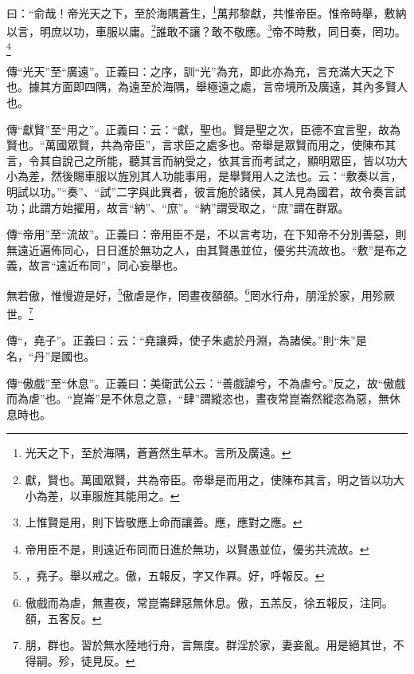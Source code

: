 曰：“俞哉！帝光天之下，至於海隅蒼生，\footnote{光天之下，至於海隅，蒼蒼然生草木。言所及廣遠。}萬邦黎獻，共惟帝臣。惟帝時舉，敷納以言，明庶以功，車服以庸。\footnote{獻，賢也。萬國眾賢，共為帝臣。帝舉是而用之，使陳布其言，明之皆以功大小為差，以車服旌其能用之。}誰敢不讓？敢不敬應。\footnote{上惟賢是用，則下皆敬應上命而讓善。應，應對之應。}帝不時敷，同日奏，罔功。\footnote{帝用臣不是，則遠近布同而日進於無功，以賢愚並位，優劣共流故。}


{\noindent\zhuan{}\fzbyks 傳“光天”至“廣遠”。正義曰：之序，訓“光”為充，即此亦為充，言充滿大天之下也。據其方面即四隅，為遠至於海隅，舉極遠之處，言帝境所及廣遠，其內多賢人也。 \par}

{\noindent\zhuan{}\fzbyks 傳“獻賢”至“用之”。正義曰：云：“獻，聖也。賢是聖之次，臣德不宜言聖，故為賢也。“萬國眾賢，共為帝臣”，言求臣之處多也。帝舉是眾賢而用之，使陳布其言，令其自說己之所能，聽其言而納受之，依其言而考試之，顯明眾臣，皆以功大小為差，然後賜車服以旌別其人功能事用，是舉賢用人之法也。云：“敷奏以言，明試以功。”“奏”、“試”二字與此異者，彼言施於諸侯，其人見為國君，故令奏言試功；此謂方始擢用，故言“納”、“庶”。“納”謂受取之，“庶”謂在群眾。 \par}

{\noindent\zhuan{}\fzbyks 傳“帝用”至“流故”。正義曰：帝用臣不是，不以言考功，在下知帝不分別善惡，則無遠近遍佈同心，日日進於無功之人，由其賢愚並位，優劣共流故也。“敷”是布之義，故言“遠近布同”，同心妄舉也。 \par}

無若傲，惟慢遊是好，\footnote{，堯子。舉以戒之。傲，五報反，字又作奡。好，呼報反。}傲虐是作，罔晝夜頟頟。\footnote{傲戲而為虐，無晝夜，常崑崙肆惡無休息。傲，五羔反，徐五報反，注同。頟，五客反。}罔水行舟，朋淫於家，用殄厥世。\footnote{朋，群也。習於無水陸地行舟，言無度。群淫於家，妻妾亂。用是絕其世，不得嗣。殄，徒見反。}


{\noindent\zhuan{}\fzbyks 傳“，堯子”。正義曰：云：“堯讓舜，使子朱處於丹淵，為諸侯。”則“朱”是名，“丹”是國也。 \par}

{\noindent\zhuan{}\fzbyks 傳“傲戲”至“休息”。正義曰：美衛武公云：“善戲謔兮，不為虐兮。”反之，故“傲戲而為虐”也。“崑崙”是不休息之意，“肆”謂縱恣也，晝夜常崑崙然縱恣為惡，無休息時也。 \par}

